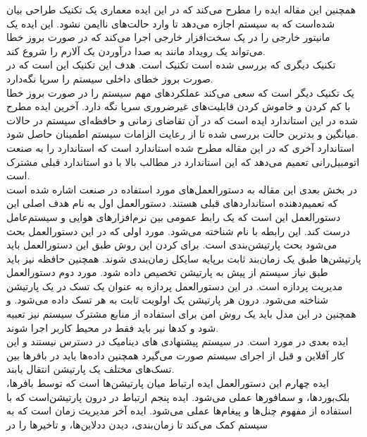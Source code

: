 \documentclass[a4paper, 12pt]{article}
\begin{document}
همچنین این مقاله ایده
را مطرح می‌کند که در این ایده معماری یک تکنیک طراحی بیان شده‌است که به سیستم اجازه می‌دهد
تا وارد حالت‌های ناایمن نشود. این  ایده یک مانیتور خارجی را در یک سخت‌افزار خارجی اجرا می‌کند که
در صورت بروز خطا می‌تواند یک رویداد مانند به صدا درآوردن یک آلارم را شروع کند. \\
تکنیک دیگری که بررسی شده است تکنیک
است.
هدف این تکنیک این است که در صورت بروز خطای داخلی سیستم را سرپا نگه‌دارد. \\
یک تکنیک دیگر
است که سعی می‌کند عملکرد‌های مهم سیستم را در صورت بروز خطا با کم کردن و خاموش کردن
قابلیت‌های غیرضروری سرپا نگه دارد.
آخرین ایده مطرح شده در این استاندارد ایده
است که در آن تقاضای زمانی و حافظه‌ای سیستم در حالات میانگین و بدترین حالت بررسی شده
تا از رعایت الزامات سیستم اطمینان حاصل شود. \\
استاندارد آخری که در این مقاله مطرح شده استاندارد
است که استاندارد
را به صنعت اتومبیل‌رانی تعمیم می‌دهد که این استاندارد در مطالب بالا با دو استاندارد قبلی مشترک است. \\
در بخش بعدی این مقاله به دستورالعمل‌های مورد استفاده در صنعت اشاره شده است که تعمیم‌دهنده استاندارد‌های
قبلی هستند.
دستور‌العمل اول به نام
هدف اصلی این دستورالعمل این است که یک رابط عمومی بین نرم‌افزار‌های هوایی و سیستم‌عامل درست کند.
این رابطه با نام
شناخته می‌شود.
مورد اولی که در این دستورالعمل بحث می‌شود بحث پارتیشن‌بندی است.
برای
کردن این روش طبق این دستورالعمل باید پارتیشن‌ها طبق یک زمان‌بند ثابت بر‌پایه سایکل
زمان‌بندی شوند. همچنین حافظه نیز باید طبق نیاز سیستم از پیش به پارتیشن تخصیص داده شود.
مورد دوم دستورالعمل مدیریت پردازه است. در این دستورالعمل پردازه به عنوان یک تسک در یک
پارتیشن شناخته می‌شود.
درون هر پارتیشن یک اولویت ثابت به هر تسک داده می‌شود. و همچنین در این مدل باید یک روش
امن برای استفاده از منابع مشترک سیستم نیز تعبیه شود و کد‌ها نیر باید فقط در محیط کاربر
اجرا شوند. \\
ایده بعدی در مورد
است.
در سیستم پیشنهادی 
های دینامیک در دسترس نیستند و این کار آفلاین و قبل از اجرای سیستم صورت می‌گیرد
همچنین داده‌ها باید در بافر‌ها بین تسک‌های مختلف یک پارتیشن انتقال یابند. \\
ایده چهارم این دستورالعمل ایده ارتباط میان پارتیشن‌ها است که توسط بافر‌ها، بلک‌بورد‌ها، و سمافور‌ها
عملی می‌شود.
ایده پنجم ارتباط در درون پارتیشن‌است که با استفاده از مفهوم چنل‌ها و پیغام‌ها عملی می‌شود.
ایده آخر مدیریت زمان است که به سیستم کمک می‌کند تا زمان‌بندی، دیدن ددلاین‌ها، و تاخیر‌ها را در
\end{document}
